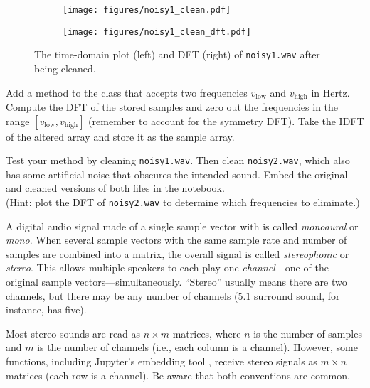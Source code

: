 \begin{figure}[H]
\captionsetup[subfigure]{justification=centering}
\centering
\begin{subfigure}{.53\textwidth}
    \centering
    \texttt{[image: figures/noisy1\_clean.pdf]}
\end{subfigure}%
\begin{subfigure}{.47\textwidth}
    \centering
    \texttt{[image: figures/noisy1\_clean\_dft.pdf]}
\end{subfigure}
\caption{The time-domain plot (left) and DFT (right) of \texttt{noisy1.wav} after being cleaned.}
\label{fig:fft-noisy-cleaned}
\end{figure}

\begin{problem} %
\label{prob:fft-filter-frequencies}
Add a method to the  class that accepts two frequencies $v_\text{low}$ and $v_\text{high}$ in Hertz.
Compute the DFT of the stored samples and zero out the frequencies in the range $[v_\text{low}, v_\text{high}]$ (remember to account for the symmetry DFT).
Take the IDFT of the altered array and store it as the sample array.

Test your method by cleaning \texttt{noisy1.wav}.
Then clean \texttt{noisy2.wav}, which also has some artificial noise that obscures the intended sound.
Embed the original and cleaned versions of both files in the notebook.
\\(Hint: plot the DFT of \texttt{noisy2.wav} to determine which frequencies to eliminate.)
\end{problem}

A digital audio signal made of a single sample vector with is called \emph{monoaural} or \emph{mono}.
When several sample vectors with the same sample rate and number of samples are combined into a matrix, the overall signal is called \emph{stereophonic} or \emph{stereo}.
This allows multiple speakers to each play one \emph{channel}---one of the original sample vectors---simultaneously.
``Stereo'' usually means there are two channels, but there may be any number of channels ($5.1$ surround sound, for instance, has five).

Most stereo sounds are read as $n\times m$ matrices, where $n$ is the number of samples and $m$ is the number of channels (i.e., each column is a channel).
However, some functions, including Jupyter's embedding tool , receive stereo signals as $m\times n$ matrices (each row is a channel).
Be aware that both conventions are common.

